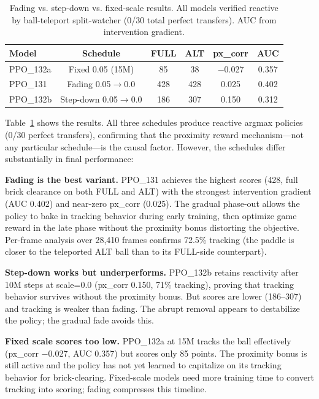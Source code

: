 \documentclass[11pt]{article}
\begin{document}
\begin{table}[h]
\centering
\begin{tabular}{lccccc}
\toprule
\textbf{Model} & \textbf{Schedule} & \textbf{FULL} & \textbf{ALT} &
\textbf{px\_corr} & \textbf{AUC} \\
\midrule
PPO\_132a & Fixed 0.05 (15M)      & 85  & 38  & $-$0.027 & 0.357 \\
PPO\_131  & Fading 0.05$\to$0.0  & 428 & 428 & 0.025    & 0.402 \\
PPO\_132b & Step-down 0.05$\to$0.0& 186 & 307 & 0.150    & 0.312 \\
\bottomrule
\end{tabular}
\caption{Fading vs. step-down vs. fixed-scale results. All models verified
reactive by ball-teleport split-watcher (0/30 total perfect transfers). AUC
from intervention gradient.}
\label{tab:fading}
\end{table}

Table~\ref{tab:fading} shows the results. All three schedules produce reactive
argmax policies (0/30 perfect transfers), confirming that the proximity reward
mechanism---not any particular schedule---is the causal factor. However, the
schedules differ substantially in final performance:

\textbf{Fading is the best variant.} PPO\_131 achieves the highest scores (428,
full brick clearance on both FULL and ALT) with the strongest intervention
gradient (AUC 0.402) and near-zero px\_corr (0.025). The gradual phase-out
allows the policy to bake in tracking behavior during early training, then
optimize game reward in the late phase without the proximity bonus distorting
the objective. Per-frame analysis over 28,410 frames confirms 72.5\% tracking
(the paddle is closer to the teleported ALT ball than to its FULL-side
counterpart).

\textbf{Step-down works but underperforms.} PPO\_132b retains reactivity after
10M steps at scale=0.0 (px\_corr 0.150, 71\% tracking), proving that tracking
behavior survives without the proximity bonus. But scores are lower
(186--307) and tracking is weaker than fading. The abrupt removal appears to
destabilize the policy; the gradual fade avoids this.

\textbf{Fixed scale scores too low.} PPO\_132a at 15M tracks the ball
effectively (px\_corr $-$0.027, AUC 0.357) but scores only 85 points. The
proximity bonus is still active and the policy has not yet learned to
capitalize on its tracking behavior for brick-clearing. Fixed-scale models
need more training time to convert tracking into scoring; fading compresses
this timeline.
\end{document}
